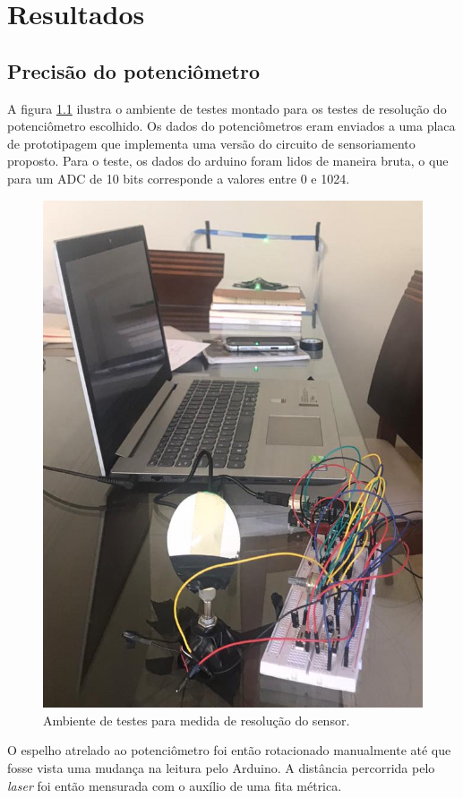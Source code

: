 \chapter{Resultados}

\label{CapResultados}

\section{Precisão do potenciômetro}
A figura \ref{fig:result-resolution} ilustra o ambiente de testes montado para os
testes de resolução do potenciômetro escolhido. Os dados do potenciômetros eram 
enviados a uma placa de prototipagem que implementa uma versão do circuito
de sensoriamento proposto. Para o teste, os dados do arduino foram lidos de 
maneira bruta, o que para um ADC de 10 bits corresponde a valores entre 0 e 1024.

\begin{figure}[h]
    \caption{Ambiente de testes para medida de resolução do sensor.}

    \begin{centering}
        \includegraphics[width=0.5\columnwidth]{images/resultados/resolution.jpg} 
    \par\end{centering}

    \label{fig:result-resolution}
\end{figure}

O espelho atrelado ao potenciômetro foi então rotacionado manualmente até
que fosse vista uma mudança na leitura pelo Arduino. A distância percorrida
pelo \textit{laser} foi então mensurada com o auxílio de uma fita métrica.

